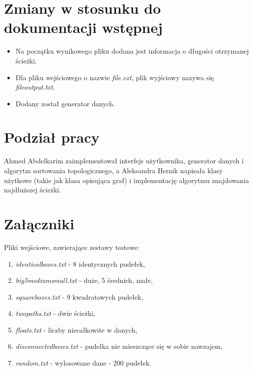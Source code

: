 \documentclass{article}
\begin{document}
\section{Zmiany w stosunku do dokumentacji wstępnej}
\begin{itemize}
\item Na początku wynikowego pliku dodana jest informacja o długości otrzymanej ścieżki.
\item Dla pliku wejściowego o nazwie \textit{file.ext}, plik wyjściowy nazywa się \textit{file\textunderscore output.txt}.
\item Dodany został generator danych.
\end{itemize}

\section{Podział pracy}
Ahmed Abdelkarim zaimplementował interfejs użytkownika, generator danych i algorytm sortowania topologicznego, a Aleksandra Hernik napisała klasy użytkowe (takie jak klasa opisująca graf) i implementację algorytmu znajdowania najdłuższej ścieżki.

\section{Załączniki}
Pliki wejściowe, zawierające zestawy testowe:
\begin{enumerate}
\item \textit{identical\textunderscore boxes.txt} - 8 identycznych pudełek,
\item \textit{big\textunderscore 5medium\textunderscore small.txt} - duże, 5 średnich, małe,
\item \textit{square\textunderscore boxes.txt} - 9 kwadratowych pudełek,
\item \textit{two\textunderscore paths.txt} - dwie ścieżki,
\item \textit{floats.txt} - liczby niecałkowite w danych,
\item \textit{disconnected\textunderscore boxes.txt} - pudełka nie mieszczące się w sobie nawzajem,
\item \textit{random.txt} - wylosowane dane - 200 pudełek.

\end{enumerate}
\end{document}
